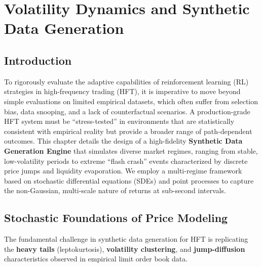 \chapter{Volatility Dynamics and Synthetic Data Generation}
\label{ch:volatility_modeling}

\section{Introduction}
To rigorously evaluate the adaptive capabilities of reinforcement learning (RL) strategies in high-frequency trading (HFT), it is imperative to move beyond simple evaluations on limited empirical datasets, which often suffer from selection bias, data snooping, and a lack of counterfactual scenarios. A production-grade HFT system must be ``stress-tested'' in environments that are statistically consistent with empirical reality but provide a broader range of path-dependent outcomes. This chapter details the design of a high-fidelity \textbf{Synthetic Data Generation Engine} that simulates diverse market regimes, ranging from stable, low-volatility periods to extreme ``flash crash'' events characterized by discrete price jumps and liquidity evaporation. We employ a multi-regime framework based on stochastic differential equations (SDEs) and point processes to capture the non-Gaussian, multi-scale nature of returns at sub-second intervals.

\section{Stochastic Foundations of Price Modeling}
The fundamental challenge in synthetic data generation for HFT is replicating the \textbf{heavy tails} (leptokurtosis), \textbf{volatility clustering}, and \textbf{jump-diffusion} characteristics observed in empirical limit order book data.

